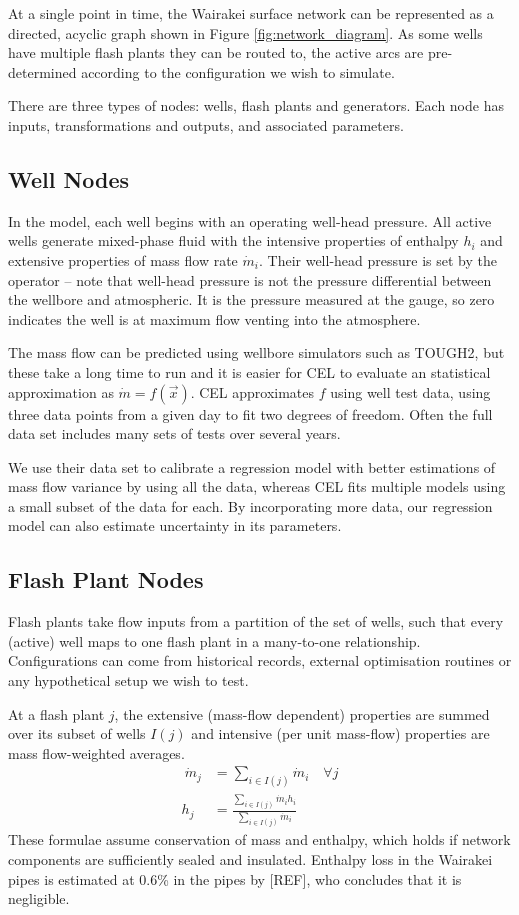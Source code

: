 \documentclass[a4paper, 12pt]{article}
\begin{document}
At a single point in time, the Wairakei surface network can be represented as a directed, acyclic graph shown in Figure \ref{fig:network_diagram}. As some wells have multiple flash plants they can be routed to, the active arcs are pre-determined according to the configuration we wish to simulate.

There are three types of nodes: wells, flash plants and generators. Each node has inputs, transformations and outputs, and associated parameters.

\subsection{Well Nodes}
In the model, each well begins with an operating well-head pressure. All active wells generate mixed-phase fluid with the intensive properties of enthalpy $h_i$ and extensive properties of mass flow rate $\dot{m}_i$. Their well-head pressure is set by the operator -- note that well-head pressure is not the pressure differential between the wellbore and atmospheric. It is the pressure measured at the gauge, so zero indicates the well is at maximum flow venting into the atmosphere.

The mass flow can be predicted using wellbore simulators such as TOUGH2, but these take a long time to run and it is easier for CEL to evaluate an statistical approximation as $\dot{m} = f(\vec{x})$. CEL approximates $f$ using well test data, using three data points from a given day to fit two degrees of freedom. Often the full data set includes many sets of tests over several years.

We use their data set to calibrate a regression model with better estimations of mass flow variance by using all the data, whereas CEL fits multiple models using a small subset of the data for each. By incorporating more data, our regression model can also estimate uncertainty in its parameters.

\subsection{Flash Plant Nodes}
Flash plants take flow inputs from a partition of the set of wells, such that every (active) well maps to one flash plant in a many-to-one relationship. Configurations can come from historical records, external optimisation routines or any hypothetical setup we wish to test.

At a flash plant $j$, the extensive (mass-flow dependent) properties are summed over its subset of wells $I(j)$ and intensive (per unit mass-flow) properties are mass flow-weighted averages.
\begin{align} \
\dot{m}_j &= \sum_{i\in I(j)} \dot{m}_i\quad \forall j \label{eq:fp_mf} \\
h_j &= \frac{\sum_{i\in I(j)} \dot{m}_i h_i}{\sum_{i\in I(j)} \dot{m}_i} \label{eq:fp_h}
\end{align}
These formulae assume conservation of mass and enthalpy, which holds if network components are sufficiently sealed and insulated. Enthalpy loss in the Wairakei pipes is estimated at 0.6\% in the pipes by [REF], who concludes that it is negligible.
\end{document}
